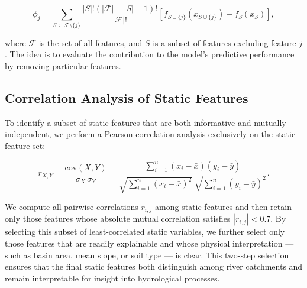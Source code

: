 \begin{equation}
    \phi_j = \sum_{S \subseteq \mathcal{F}\setminus \{j\}} \frac{|S|!(|\mathcal{F}| - |S| - 1)!}{|\mathcal{F}|!}\left[ f_{S \cup \{j\}}(x_{S \cup \{j\}}) - f_S(x_S)\right],
\end{equation}

where $\mathcal{F}$ is the set of all features, and $S$ is a subset of features excluding feature $j$. The idea is to evaluate the contribution to the model’s predictive performance by removing particular features.



\subsection{Correlation Analysis of Static Features}

To identify a subset of static features that are both informative and mutually independent, we perform a Pearson correlation analysis exclusively on the static feature set:

\begin{equation}
    r_{X,Y} = \frac{\mathrm{cov}(X,Y)}{\sigma_X \,\sigma_Y}
    = \frac{\sum_{i=1}^{n}(x_i - \bar{x})(y_i - \bar{y})}{\sqrt{\sum_{i=1}^{n}(x_i - \bar{x})^2}\;\sqrt{\sum_{i=1}^{n}(y_i - \bar{y})^2}}.
\end{equation}

We compute all pairwise correlations $r_{i,j}$ among static features and then retain only those features whose absolute mutual correlation satisfies $|r_{i,j}| < 0.7$. By selecting this subset of least‐correlated static variables, we further select only those features that are readily explainable and whose physical interpretation --- such as basin area, mean slope, or soil type --- is clear. This two‐step selection ensures that the final static features both distinguish among river catchments and remain interpretable for insight into hydrological processes.

